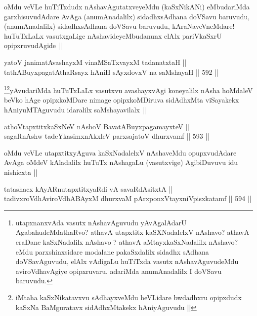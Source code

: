 \begin{artha}
oMdu veVLe huTiTxdudx nAshavAgutatxveyeMdu (kaSxNikANi) eMbudariMda garxhisuvudAdare AvAga (anumAnadalilx) sidadhxsAdhana doVSavu baruvudu, (anumAnadalilx) sidadhxsAdhana doVSavu baruvudu, kAraNaveVneMdare! huTuTxLaLx vasutxgaLige nAshavideyeMbudanunx elAlx pariVkaSxrU opipxruvudAgide ||
\end{artha}


\begin{shl}
yatoV janimatA\s vashayxM vinaMSaTxvayxM tadanatxtaH || \\
tathA\s BuyxpagatAthaRsayx hAniH sAyxdovxV na saMshayaH ||  592 ||  
\end{shl}

\begin{artha}
\footnote{utapxnanxvAda vasutx nAshavAguvudu yAvAgalAdarU AgabahudeMdathaRvo? athavA utapxtitx kaSXNadalelxV nAshavo? athavA eraDane kaSxNadalilx nAshavo
? athavA aMtayxkaSxNadalilx nAshavo? eMdu parxshinxsidare modalane pakaSxdalilx sidadhx sAdhana doVSavAguvudu, elAlx vAdigaLu huTiTxda vasutx nAshavAguvudeMdu aviroVdhavAgiye opipxruvaru. adariMda anumAnadalilx I doVSavu baruvudu.}\footnote{iMtaha kaSxNikatavxvu sAdhayxveMdu heVLidare bwdadhxru opipxdudx kaSxNa BaMguratavx sidAdhxMtakekx hAniyAguvudu ||}yAvudariMda huTuTxLaLx vasutxvu avashayxvAgi koneyalilx nAsha hoMdaleV beVko hAge opipxkoMDare nimage opipxkoMDiruva sidAdhxMta viSayakekx hAniyuMTAguvudu idaralilx saMshayavilalx ||  
\end{artha}

\begin{shl}
athoVtapxtitxkaSxNeV nAshoV BavatA\s BuyxpagamayxteV || \\
sagaRnAshw tadeYkasimxnAkxleV parxsajatoV dhurxvamf ||  593 ||  
\end{shl}

\begin{artha}
oMdu veVLe utapxtitxyAguva kaSxNadalelxV nAshaveMdu opupxvudAdare AvAga oMdeV kAladalilx huTuTx nAshagaLu (vasutxvige) AgibiDuvuvu idu nishicxta ||
\end{artha}


\begin{shl}
tatashacx kAyARnutapxtitxyaRdi vA savaRdA\s sitxtA || \\
tadivxroVdhAviroVdhABAyxM dhurxvaM pArxponxVtayxniVpisxkatamf ||  594 ||  
\end{shl}


